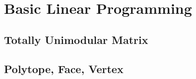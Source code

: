 \chapter{Basic Linear Programming}
\section{Totally Unimodular Matrix}
\section{Polytope, Face, Vertex}
